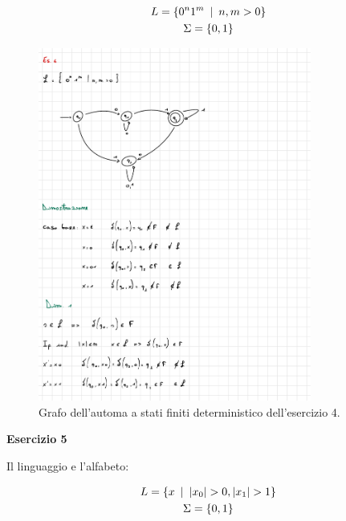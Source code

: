 \documentclass[a4paper]{article}
\begin{document}
	\begin{gather*}
		L = \left\{0^{n} 1^{m} \hspace{0.5em} | \hspace{0.5em} n,m > 0\right\} \\
		\Sigma = \left\{0, 1\right\}
	\end{gather*}
	
	\begin{figure}[!htp]
		\centering
		\includegraphics[width=0.8\textwidth]{img/esercitazioni/01_exe4.pdf}
		\caption{Grafo dell'automa a stati finiti deterministico dell'esercizio 4.}\label{ASFD-esercizio_4}
	\end{figure}

	\newpage

	\noindent
	\textcolor{Red3}{\textbf{Esercizio 5}}\newline
	
	\noindent
	Il linguaggio e l'alfabeto:
	
	\begin{gather*}
		L = \left\{x \hspace{0.5em} | \hspace{0.5em} |x_{0}| > 0, |x_{1}| > 1\right\} \\
		\Sigma = \left\{0, 1\right\}
	\end{gather*}
	
\end{document}
